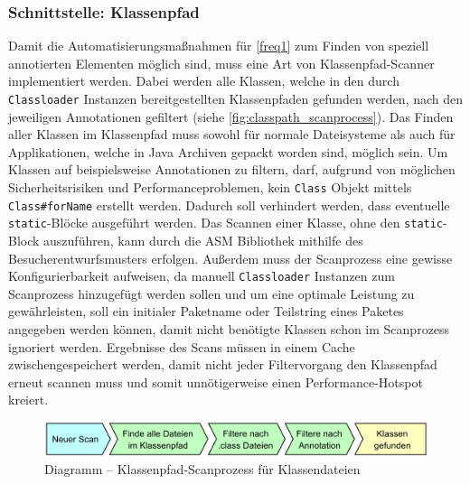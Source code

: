 \subsubsection{Schnittstelle: Klassenpfad}
\label{classpath_interface}
Damit die Automatisierungsmaßnahmen für \autoref{freq1} zum Finden von speziell annotierten Elementen möglich sind, muss eine Art von Klassenpfad-Scanner implementiert werden. Dabei werden alle Klassen, welche in den durch \texttt{Classloader} Instanzen bereitgestellten Klassenpfaden gefunden werden, nach den jeweiligen Annotationen gefiltert (siehe \autoref{fig:classpath_scanprocess}). Das Finden aller Klassen im Klassenpfad muss sowohl für normale Dateisysteme als auch für Applikationen, welche in Java Archiven gepackt worden sind, möglich sein. Um Klassen auf beispielsweise Annotationen zu filtern, darf, aufgrund von möglichen Sicherheitsrisiken und Performanceproblemen, kein \texttt{Class} Objekt mittels \texttt{Class\#forName} erstellt werden. Dadurch soll verhindert werden, dass eventuelle \texttt{static}-Blöcke ausgeführt werden. Das Scannen einer Klasse, ohne den \texttt{static}-Block auszuführen, kann durch die ASM Bibliothek mithilfe des Besucherentwurfsmusters erfolgen. Außerdem muss der Scanprozess eine gewisse Konfigurierbarkeit aufweisen, da manuell \texttt{Classloader} Instanzen zum Scanprozess hinzugefügt werden sollen und um eine optimale Leistung zu gewährleisten, soll ein initialer Paketname oder Teilstring eines Paketes angegeben werden können, damit nicht benötigte Klassen schon im Scanprozess ignoriert werden. Ergebnisse des Scans müssen in einem Cache zwischengespeichert werden, damit nicht jeder Filtervorgang den Klassenpfad erneut scannen muss und somit unnötigerweise einen Performance-Hotspot kreiert.
\begin{figure}[H]
	\centering
	\includegraphics[width=\textwidth]{Abbildungen/Klassenpfad Scanprozess.png}
	\caption{Diagramm -- Klassenpfad-Scanprozess für Klassendateien}
	\label{fig:classpath_scanprocess}
\end{figure}
